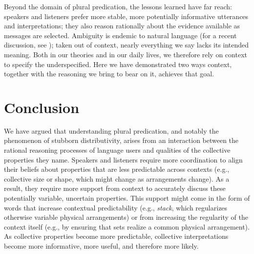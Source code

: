 \documentclass[linguex]{sp}
\begin{document}


Beyond the domain of plural predication, the lessons learned have far reach: speakers and listeners prefer more stable, more potentially informative utterances and interpretations; they also reason rationally about the evidence available as messages are selected. Ambiguity is endemic to natural language (for a recent discussion, see \citealp{piantadosietal2012}); taken out of context, nearly everything we say lacks its intended meaning. Both in our theories and in our daily lives, we therefore rely on context to specify the underspecified. Here we have demonstrated two ways context, together with the reasoning we bring to bear on it, achieves that goal.


\section{Conclusion}

We have argued that understanding plural predication, and notably the phenomenon of stubborn distributivity, arises from an interaction between the rational reasoning processes of language users and qualities of the collective properties they name. Speakers and listeners require more coordination to align their beliefs about properties that are less predictable across contexts (e.g., collective size or shape, which might change as arrangements change). As a result, they require more support from context to accurately discuss these potentially variable, uncertain properties. This support might come in the form of words that increase contextual predictability (e.g., \emph{stack}, which regularizes otherwise variable physical arrangements) or from increasing the regularity of the context itself (e.g., by ensuring that sets realize a common physical arrangement). As collective properties become more predictable, collective interpretations become more informative, more useful, and therefore more likely.
\end{document}
